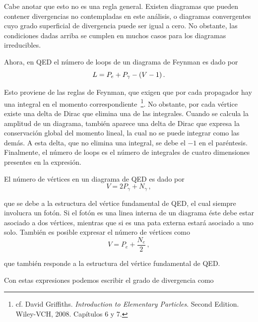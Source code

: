 Cabe anotar que esto no es una regla general. Existen diagramas que pueden contener divergencias no contempladas en este análisis, o diagramas convergentes cuyo grado superficial de divergencia puede ser igual a cero. No obstante, las condiciones dadas arriba se cumplen en muchos casos para los diagramas irreducibles.

Ahora, en QED el número de loops de un diagrama de Feynman es dado por
%
\begin{equation}
	L = P_e + P_\gamma - \qty(V - 1) \,.
\end{equation}

Esto proviene de las reglas de Feynman, que exigen que por cada propagador hay una integral en el momento correspondiente~\footnote{cf. David Griffiths. \emph{Introduction to Elementary Particles}. Second Edition. Wiley-VCH, 2008. Capítulos 6 y 7.}. No obstante, por cada vértice existe una delta de Dirac que elimina una de las integrales. Cuando se calcula la amplitud de un diagrama, también aparece una delta de Dirac que expresa la conservación global del momento lineal, la cual no se puede integrar como las demás. A esta delta, que no elimina una integral, se debe el $-1$ en el paréntesis. Finalmente, el número de loops es el número de integrales de cuatro dimensiones presentes en la expresión.

El número de vértices en un diagrama de QED es dado por
%
\begin{equation}
	V = 2P_\gamma + N_\gamma \,,
\end{equation}

\noindent que se debe a la estructura del vértice fundamental de QED, el cual siempre involucra un fotón. Si el fotón es una linea interna de un diagrama éste debe estar asociado a dos vértices, mientras que si es una pata externa estará asociado a uno solo. También es posible expresar el número de vértices como
%
\begin{equation}
	V = P_e + \frac{N_e}{2}\,,
\end{equation}

\noindent que también responde a la estructura del vértice fundamental de QED.

Con estas expresiones podemos escribir el grado de divergencia como
%


